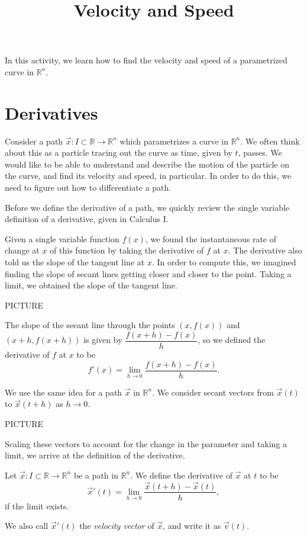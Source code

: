 \documentclass{ximera}
\title{Velocity and Speed}
\begin{document}
\begin{abstract}
\end{abstract}
\maketitle

In this activity, we learn how to find the velocity and speed of a parametrized curve in $\mathbb{R}^n$.

\section{Derivatives}

Consider a path $\vec{x}:I\subset\mathbb{R}\rightarrow\mathbb{R}^n$ which parametrizes a curve in $\mathbb{R}^n$. We often think about this as a particle tracing out the curve as time, given by $t$, passes. We would like to be able to understand and describe the motion of the particle on the curve, and find its velocity and speed, in particular. In order to do this, we need to figure out how to differentiate a path.

Before we define the derivative of a path, we quickly review the single variable definition of a derivative, given in Calculus I.

Given a single variable function $f(x)$, we found the instantaneous rate of change at $x$ of this function by taking the derivative of $f$ at $x$. The derivative also told us the slope of the tangent line at $x$. In order to compute this, we imagined finding the slope of secant lines getting closer and closer to the point. Taking a limit, we obtained the slope of the tangent line.

PICTURE

The slope of the secant line through the points $(x,f(x))$ and $(x+h,f(x+h))$ is given by $\dfrac{f(x+h)-f(x)}{h}$, so we defined the derivative of $f$ at $x$ to be
\[
f'(x) = \lim_{h\rightarrow 0}\frac{f(x+h)-f(x)}{h}.
\]

We use the same idea for a path $\vec{x}$ in $\mathbb{R}^n$. We consider secant vectors from $\vec{x}(t)$ to $\vec{x}(t+h)$ as $h\rightarrow 0$.

PICTURE

Scaling these vectors to account for the change in the parameter and taking a limit, we arrive at the definition of the derivative.

\begin{definition}
Let $\vec{x}:I\subset\mathbb{R}\rightarrow\mathbb{R}^n$ be a path in $\mathbb{R}^n$. We define the derivative of $\vec{x}$ at $t$ to be
\[
\vec{x}'(t) = \lim_{h\rightarrow 0} \frac{\vec{x}(t+h) - \vec{x}(t)}{h},
\]
if the limit exists.

We also call $\vec{x}'(t)$ the \emph{velocity vector} of $\vec{x}$, and write it as $\vec{v}(t)$.
\end{definition}
\end{document}
